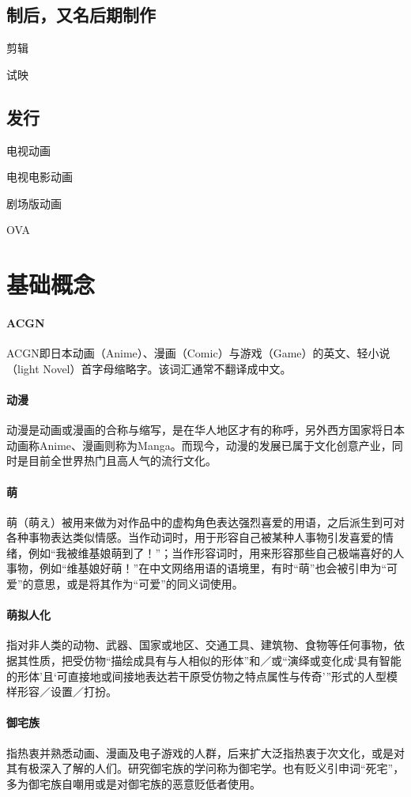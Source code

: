 \documentclass[UTF8,12pt]{ctexart}
\begin{document}
\subsection{制后，又名后期制作}
剪辑

试映

\subsection{发行}
电视动画

电视电影动画

剧场版动画

OVA

\section{基础概念}
\paragraph{ACGN}ACGN即日本动画（Anime）、漫画（Comic）与游戏（Game）的英文、轻小说（light Novel）首字母缩略字。该词汇通常不翻译成中文。
\paragraph{动漫}动漫是动画或漫画的合称与缩写，是在华人地区才有的称呼，另外西方国家将日本动画称Anime、漫画则称为Manga。而现今，动漫的发展已属于文化创意产业，同时是目前全世界热门且高人气的流行文化。
\paragraph{萌}萌（萌え）被用来做为对作品中的虚构角色表达强烈喜爱的用语，之后派生到可对各种事物表达类似情感。当作动词时，用于形容自己被某种人事物引发喜爱的情绪，例如“我被维基娘萌到了！”；当作形容词时，用来形容那些自己极端喜好的人事物，例如“维基娘好萌！”在中文网络用语的语境里，有时“萌”也会被引申为“可爱”的意思，或是将其作为“可爱”的同义词使用。
\paragraph{萌拟人化}指对非人类的动物、武器、国家或地区、交通工具、建筑物、食物等任何事物，依据其性质，把受仿物“描绘成具有与人相似的形体”和／或“演绎或变化成‘具有智能的形体’且‘可直接地或间接地表达若干原受仿物之特点属性与传奇’”形式的人型模样形容／设置／打扮。
\paragraph{御宅族}指热衷并熟悉动画、漫画及电子游戏的人群，后来扩大泛指热衷于次文化，或是对其有极深入了解的人们。研究御宅族的学问称为御宅学。也有贬义引申词“死宅”，多为御宅族自嘲用或是对御宅族的恶意贬低者使用。
\end{document}
